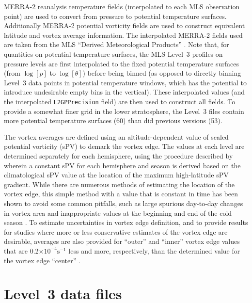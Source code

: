 MERRA-2 \citep{GelaroEtal:2017} reanalysis temperature fields (interpolated to each MLS observation point) are used to convert from pressure to potential temperature surfaces. Additionally MERRA-2 potential vorticity fields are used to construct equivalent latitude and vortex average information. The interpolated MERRA-2 fields used are taken from the MLS ``Derived Meteorological Products'' \citep{ManneyEtal:2007, ManneyEtal:2011:Jets}. Note that, for quantities on potential temperature surfaces, the MLS Level~3 profiles on pressure levels are first interpolated to the fixed potential temperature surfaces (from $\log[p]$ to $\log[\theta]$) before being binned (as opposed to directly binning Level~3 data points in potential temperature windows, which has the potential to introduce undesirable empty bins in the vertical). These interpolated values (and the interpolated \verb+L2GPPrecision+ field) are then used to construct all fields. To provide a somewhat finer grid in the lower stratosphere, the \thisv Level~3 files contain more potential temperature surfaces (60) than did previous versions (53).

The vortex averages are defined using an altitude-dependent value of scaled potential vorticity (sPV) to demark the vortex edge. The values at each level are determined separately for each hemisphere, using the procedure described by \citet{LawrenceEtal:2018} wherein a constant sPV for each hemisphere and season is derived based on the climatological sPV value at the location of the maximum high-latitude sPV gradient. While there are numerous methods of estimating the location of the vortex edge, this simple method with a value that is constant in time has been shown to avoid some common pitfalls, such as large spurious day-to-day changes in vortex area and inappropriate values at the beginning and end of the cold season \citep[see][for a discussion of pros and cons of various vortex edge identification methods]{LawrenceandManney:2018}. To estimate uncertainties in vortex edge definition, and to provide results for studies where more or less conservative estimates of the vortex edge are desirable, averages are also provided for ``outer'' and ``inner'' vortex edge values that are 0.2$\times 10^{-4} \mathrm{s}^{-1}$ less and more, respectively, than the determined value for the vortex edge ``center'' \citep[this also follows][]{LawrenceEtal:2018}.

\section{Level~3 data files}
\label{sec:L3files}

